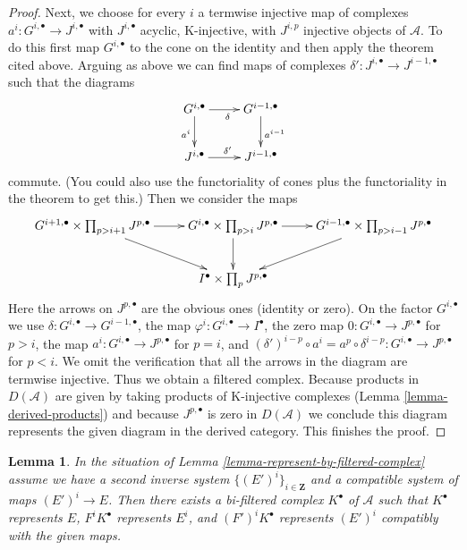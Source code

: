 \documentclass{stacks-project}
\theoremstyle{plain}
\newtheorem{lemma}[subsection]{Lemma}
\theoremstyle{definition}
\theoremstyle{remark}
\numberwithin{equation}{subsection}
\begin{document}
\begin{proof}
\medskip\noindent
Next, we choose for every $i$ a termwise injective map of complexes
$a^i : G^{i, \bullet} \to J^{i, \bullet}$ with $J^{i, \bullet}$
acyclic, K-injective, with $J^{i, p}$ injective objects of $\mathcal{A}$.
To do this first map $G^{i, \bullet}$ to the cone on the identity
and then apply the theorem cited above.
Arguing as above we can find maps of complexes
$\delta' : J^{i, \bullet} \to J^{i - 1, \bullet}$ such that the diagrams
$$
\xymatrix{
G^{i, \bullet} \ar[r]_\delta \ar[d]_{a^i} &
G^{i - 1, \bullet} \ar[d]^{a^{i - 1}} \\
J^{i, \bullet} \ar[r]^{\delta'} &
J^{i - 1, \bullet}
}
$$
commute. (You could also use the functoriality of cones plus the
functoriality in the theorem to get this.)
Then we consider the maps
$$
\xymatrix{
G^{i + 1, \bullet} \times \prod\nolimits_{p > i + 1} J^{p, \bullet}
\ar[r] \ar[rd] &
G^{i, \bullet} \times \prod\nolimits_{p > i} J^{p, \bullet}
\ar[r] \ar[d] &
G^{i - 1, \bullet} \times \prod\nolimits_{p > i - 1} J^{p, \bullet}
\ar[ld] \\
& I^\bullet \times \prod\nolimits_p J^{p, \bullet}
}
$$
Here the arrows on $J^{p, \bullet}$ are the obvious ones
(identity or zero). On the factor $G^{i, \bullet}$ we use
$\delta : G^{i, \bullet} \to G^{i - 1, \bullet}$, the map
$\varphi^i : G^{i, \bullet} \to I^\bullet$, the zero map
$0 : G^{i, \bullet} \to J^{p, \bullet}$ for $p > i$, the map
$a^i : G^{i, \bullet} \to J^{p, \bullet}$ for $p = i$, and
$(\delta')^{i - p} \circ a^i = a^p \circ \delta^{i - p} :
G^{i, \bullet} \to J^{p, \bullet}$ for $p < i$.
We omit the verification that all the arrows
in the diagram are termwise injective. Thus we obtain a filtered
complex. Because products in $D(\mathcal{A})$ are given by
taking products of K-injective complexes
(Lemma \ref{lemma-derived-products})
and because $J^{p, \bullet}$ is zero in $D(\mathcal{A})$
we conclude this diagram represents the given diagram in the derived
category. This finishes the proof.
\end{proof}

\begin{lemma}
\label{lemma-represent-by-filtered-complex-bis}
In the situation of Lemma \ref{lemma-represent-by-filtered-complex}
assume we have a second inverse system $\{(E')^i\}_{i \in \mathbf{Z}}$
and a compatible system of maps $(E')^i \to E$.
Then there exists a bi-filtered complex $K^\bullet$ of $\mathcal{A}$
such that $K^\bullet$ represents $E$, $F^iK^\bullet$ represents $E^i$,
and $(F')^iK^\bullet$ represents $(E')^i$ compatibly with the given maps.
\end{lemma}
\end{document}

